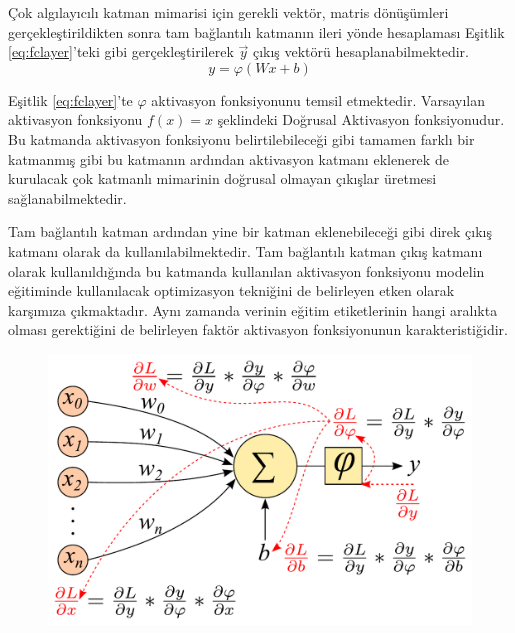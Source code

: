 Çok algılayıcılı katman mimarisi için gerekli vektör, matris dönüşümleri gerçekleştirildikten sonra tam bağlantılı katmanın ileri yönde hesaplaması Eşitlik \ref{eq:fclayer}'teki gibi gerçekleştirilerek $\overset{\rightarrow}{y}$ çıkış vektörü hesaplanabilmektedir. 
\begin{equation}
	\label{eq:fclayer}
	y = \varphi(Wx + b)
\end{equation} 

Eşitlik \ref{eq:fclayer}'te $\varphi$ aktivasyon fonksiyonunu temsil etmektedir. Varsayılan aktivasyon fonksiyonu $f(x) = x$ şeklindeki Doğrusal Aktivasyon fonksiyonudur. Bu katmanda aktivasyon fonksiyonu belirtilebileceği gibi tamamen farklı bir katmanmış gibi bu katmanın ardından aktivasyon katmanı eklenerek de kurulacak çok katmanlı mimarinin doğrusal olmayan çıkışlar üretmesi sağlanabilmektedir.

Tam bağlantılı katman ardından yine bir katman eklenebileceği gibi direk çıkış katmanı olarak da kullanılabilmektedir. Tam bağlantılı katman çıkış katmanı olarak kullanıldığında bu katmanda kullanılan aktivasyon fonksiyonu modelin eğitiminde kullanılacak optimizasyon tekniğini de belirleyen etken olarak karşımıza çıkmaktadır. Aynı zamanda verinin eğitim etiketlerinin hangi aralıkta olması gerektiğini de belirleyen faktör aktivasyon fonksiyonunun karakteristiğidir. 

\begin{figure}[h!]
	\begin{center}
		\vspace{0.4cm}
		{
			\vspace{0.4cm}
			\includegraphics[scale=0.55]{Yapilan-Calismalar/Figures/perceptronDerivative.pdf}
		}
	\end{center}
\end{figure}

